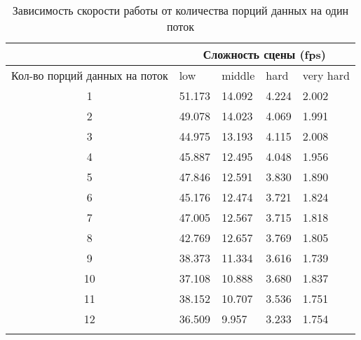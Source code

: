 \begin{center}
\begin{longtable}{|c|p{2cm}|p{2cm}|p{2cm}|p{2cm}|}
\hline & \multicolumn{4}{c|}{Сложность сцены (fps)} \\ 
\hline Кол-во порций данных на поток & low & middle & hard &  very hard\\ 
\hline 1 &  51.173 & 14.092 & 4.224 & 2.002 \\ 
\hline 2 &  49.078 & 14.023 & 4.069 & 1.991 \\ 
\hline 3 &  44.975 & 13.193 & 4.115 & 2.008 \\ 
\hline 4 &  45.887 & 12.495 & 4.048 & 1.956 \\ 
\hline 5 &  47.846 & 12.591 & 3.830 & 1.890 \\ 
\hline 6 &  45.176 & 12.474 & 3.721 & 1.824 \\ 
\hline 7 &  47.005 & 12.567 & 3.715 & 1.818 \\ 
\hline 8 &  42.769 & 12.657 & 3.769 & 1.805 \\ 
\hline 9 &  38.373 & 11.334 & 3.616 & 1.739 \\ 
\hline 10 &  37.108 & 10.888 & 3.680 & 1.837 \\ 
\hline 11 &  38.152 & 10.707 & 3.536 & 1.751 \\ 
\hline 12 &  36.509 & 9.957 & 3.233 & 1.754 \\ 
\hline
\caption{Зависимость скорости работы от количества порций данных на один поток}\label{tab:performance_gs}\end{longtable}
\end{center}

